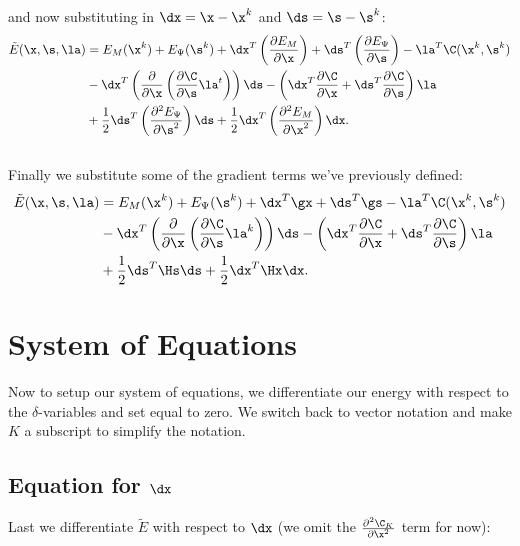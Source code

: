and now substituting in $\dx = \x - \x^k$ and $\ds = \s - \s^k$:
\begin{equation}
\begin{split}
\tilde{E}(\x,\s,\la) &=  E_M(\x^k) + E_\Psi(\s^k) + 
\dx^T \left(\frac{\partial E_M}{\partial \x} \right) 
+ \ds^T \left(\frac{\partial E_\Psi}{\partial \s} \right)   
 - \la^T \C (\x^k, \s^k) \\
& - \dx^T \left(
  \frac{\partial}{\partial \x} \left(\frac{\partial \C}{\partial \s} \la^t\right) \right)\ds
- \left( \dx^T 
  \frac{\partial \C }{\partial \x}
+  \ds^T  
  \frac{\partial \C }{\partial \s} \right) \la \\
&+ \frac{1}{2}\ds^T \left(\frac{\partial^2 E_\Psi}{\partial \s^2} \right)\ds
+ \frac{1}{2} \dx^T \left(\frac{\partial^2 E_M}{\partial \x^2}
\right)\dx. \\
&\\
\end{split}
\end{equation}
Finally we substitute some of the gradient terms we've previously defined:
\begin{equation}
\begin{split}
\tilde{E}(\x,\s,\la) &=  E_M(\x^k) + E_\Psi(\s^k) + 
\dx^T \gx
+ \ds^T \gs
 - \la^T \C (\x^k, \s^k) \\
& - \dx^T \left(
  \frac{\partial}{\partial \x} \left(\frac{\partial \C}{\partial \s} \la^k\right) \right)\ds
- \left( \dx^T 
  \frac{\partial \C }{\partial \x}
+  \ds^T  
  \frac{\partial \C }{\partial \s} \right) \la \\
& + \frac{1}{2}\ds^T \Hs \ds
+ \frac{1}{2} \dx^T \Hx \dx. \\
\end{split}
\end{equation}

\section{System of Equations}
Now to setup our system of equations, we differentiate our energy with respect to the $\delta$-variables and set equal to zero. We switch back to vector notation and make $K$ a subscript to simplify the notation.


\subsection{Equation for $\dx$}
Last we differentiate $\tilde{E}$ with respect to $\dx$ (we omit the $\frac{\partial^2 \C_K}{ \partial \x^2}$ term for now):

